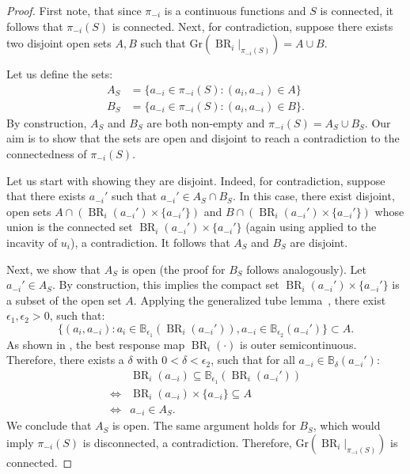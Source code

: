 \documentclass{article}
\newcommand{\B}{\mathbb{B}}
\DeclareMathOperator{\BR}{BR}
\newcommand{\Gr}{\text{Gr}}
\begin{document}
\begin{proof}
    First note, that since $\pi_{-i}$ is a continuous functions and $S$ is connected, it follows that $\pi_{-i}(S)$ is connected.
    Next, for contradiction, suppose there exists two disjoint open sets $A,B$ such that $\Gr(\BR_i|_{\pi_{-i}(S)})=A\cup B$. 

    Let us define the sets:
    \[
        \begin{aligned}
            A_S &= \{a_{-i} \in \pi_{-i}(S): (a_i,a_{-i})\in A\}\\
            B_S &= \{a_{-i} \in \pi_{-i}(S): (a_i,a_{-i})\in B\}.
        \end{aligned}
    \]
    By construction, $A_S$ and $B_S$ are both non-empty and $\pi_{-i}(S)= A_S \cup B_S$. Our aim is to show that the sets are open and disjoint to reach a contradiction to the connectedness of $\pi_{-i}(S)$.

    Let us start with showing they are disjoint. Indeed, for contradiction, suppose that there exists $a_{-i}'$ such that $a_{-i}' \in A_S \cap B_S$. In this case, there exist disjoint, open sets $A\cap \left(\BR_i(a_{-i}')\times\{a_{-i}'\}\right)$ and $B\cap \left(\BR_i(a_{-i}')\times\{a_{-i}'\}\right)$ whose union is the connected set $\BR_i(a_{-i}')\times\{a_{-i}'\}$ (again using  applied to the incavity of $u_i$), a contradiction. It follows that $A_S$ and $B_S$ are disjoint.
    
    Next, we show that $A_S$ is open (the proof for $B_S$ follows analogously). Let ${a}_{-i}' \in A_S$. By construction, this implies the compact set $\BR_i(a_{-i}')\times\{a_{-i}'\}$ is a subset of the open set $A$. Applying the generalized tube lemma~\citep{Munkres2014Topology}, there exist $\epsilon_1,\epsilon_2>0$, such that:
    \[
        \{ (a_i,a_{-i}): a_i\in \B_{\epsilon_1}(\BR_i(a_{-i}')), a_{-i}\in \B_{\epsilon_2}(a_{-i}') \} \subset A.
    \]
    As shown in , the best response map $\BR_i(\cdot)$ is outer semicontinuous. Therefore, there exists a $\delta$ with $0<\delta<\epsilon_2$, such that for all $a_{-i}\in \B_\delta(a_{-i}')$:
    \begin{align*}
        &\BR_i(a_{-i}) \subseteq  \B_{\epsilon_1}(\BR_i(a_{-i}')) \\
        \iff & \BR_i(a_{-i})\times\{a_{-i}\} \subseteq  A\\
        \iff & a_{-i} \in  A_S.
    \end{align*}
    We conclude that $A_S$ is open. The same argument holds for $B_S$, which would imply $\pi_{-i}(S)$ is disconnected, a contradiction. Therefore, $\Gr(\BR_i|_{\pi_{-i}(S)})$ is connected.
    
\end{proof}
\end{document}
